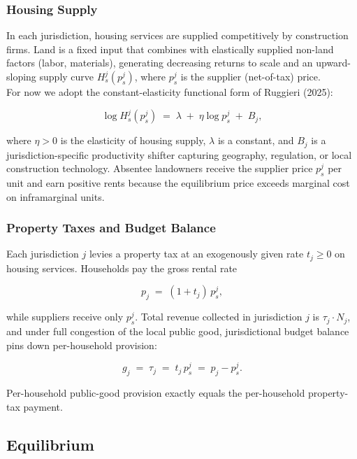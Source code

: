 \documentclass[fleqn,10pt]{olplainarticle}
\begin{document}
\subsubsection*{Housing Supply}
 
In each jurisdiction, housing services are supplied competitively by construction firms. Land is a fixed input that combines with elastically supplied non-land factors (labor, materials), generating decreasing returns to scale and an upward-sloping supply curve $H_s^j(p_s^j)$, where $p_s^j$ is the supplier (net-of-tax) price.\\
 
For now we adopt the constant-elasticity functional form of Ruggieri (2025):
 
$$\log H_s^j(p_s^j) \;=\; \lambda \;+\; \eta \log p_s^j \;+\; B_j,$$
 
where $\eta > 0$ is the elasticity of housing supply, $\lambda$ is a constant, and $B_j$ is a jurisdiction-specific productivity shifter capturing geography, regulation, or local construction technology. Absentee landowners receive the supplier price $p_s^j$ per unit and earn positive rents because the equilibrium price exceeds marginal cost on inframarginal units.\\
 
\subsubsection*{Property Taxes and Budget Balance}
 
Each jurisdiction $j$ levies a property tax at an exogenously given rate $t_j \geq 0$ on housing services. Households pay the gross rental rate
 
$$p_j \;=\; (1 + t_j)\, p_s^j,$$
 
while suppliers receive only $p_s^j$. Total revenue collected in jurisdiction $j$ is $\tau_j \cdot N_j$, and under full congestion of the local public good, jurisdictional budget balance pins down per-household provision:
 
$$g_j \;=\; \tau_j \;=\; t_j \, p_s^j \;=\; p_j - p_s^j.$$
 
Per-household public-good provision exactly equals the per-household property-tax payment.
 
\subsection*{Equilibrium}
 
\end{document}
